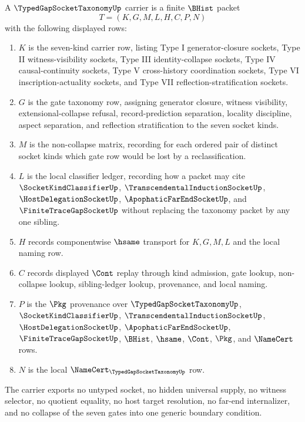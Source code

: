\begin{definition}
\label{def:typed-gap-socket-taxonomy-carrier}
A $\TypedGapSocketTaxonomyUp$ carrier is a finite $\BHist$ packet
$$
T=(K,G,M,L,H,C,P,N)
$$
with the following displayed rows:
\begin{enumerate}
\item $K$ is the seven-kind carrier row, listing Type I generator-closure sockets, Type II witness-visibility sockets, Type III identity-collapse sockets, Type IV causal-continuity sockets, Type V cross-history coordination sockets, Type VI inscription-actuality sockets, and Type VII reflection-stratification sockets.
\item $G$ is the gate taxonomy row, assigning generator closure, witness visibility, extensional-collapse refusal, record-prediction separation, locality discipline, aspect separation, and reflection stratification to the seven socket kinds.
\item $M$ is the non-collapse matrix, recording for each ordered pair of distinct socket kinds which gate row would be lost by a reclassification.
\item $L$ is the local classifier ledger, recording how a packet may cite $\SocketKindClassifierUp$, $\TranscendentalInductionSocketUp$, $\HostDelegationSocketUp$, $\ApophaticFarEndSocketUp$, and $\FiniteTraceGapSocketUp$ without replacing the taxonomy packet by any one sibling.
\item $H$ records componentwise $\hsame$ transport for $K,G,M,L$ and the local naming row.
\item $C$ records displayed $\Cont$ replay through kind admission, gate lookup, non-collapse lookup, sibling-ledger lookup, provenance, and local naming.
\item $P$ is the $\Pkg$ provenance over $\TypedGapSocketTaxonomyUp$, $\SocketKindClassifierUp$, $\TranscendentalInductionSocketUp$, $\HostDelegationSocketUp$, $\ApophaticFarEndSocketUp$, $\FiniteTraceGapSocketUp$, $\BHist$, $\hsame$, $\Cont$, $\Pkg$, and $\NameCert$ rows.
\item $N$ is the local $\NameCert_{\TypedGapSocketTaxonomyUp}$ row.
\end{enumerate}
The carrier exports no untyped socket, no hidden universal supply, no witness selector, no quotient equality, no host target resolution, no far-end internalizer, and no collapse of the seven gates into one generic boundary condition.
\end{definition}


